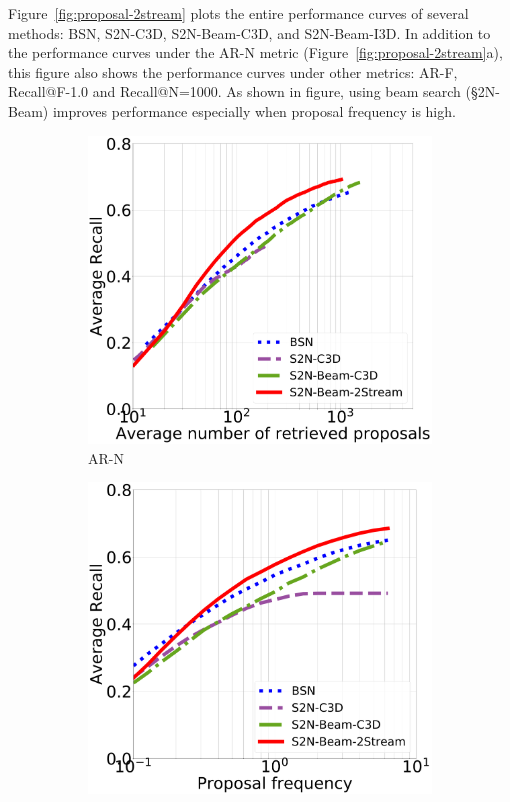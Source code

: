 \documentclass[10pt,journal,compsoc]{IEEEtran}
\begin{document}
Figure~\ref{fig:proposal-2stream} plots the entire performance curves of several methods: BSN, S2N-C3D, S2N-Beam-C3D, and S2N-Beam-I3D. In addition to the performance curves under the AR-N metric (Figure~\ref{fig:proposal-2stream}a), this figure also shows the performance curves under other metrics: AR-F, Recall@F-1.0 and Recall@N=1000. As shown in figure, using beam search (\S2N-Beam) improves performance especially when proposal frequency is high.


\begin{figure}[t]
\centering
    
    \begin{subfigure}[b]{0.24\textwidth}
   	\includegraphics[width=\textwidth]{figures/results/S2N-Beam-2Stream_avg_recall.pdf}
    \caption{AR-N}
   \end{subfigure}
   \begin{subfigure}[b]{0.24\textwidth}
   	\includegraphics[width=\textwidth]{figures/results/S2N-Beam-2Stream_freq.pdf}

\end{subfigure}
\end{figure}
\end{document}
